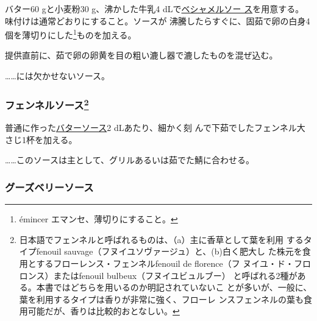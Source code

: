 \begin{recette}
バター60 gと小麦粉30 g、沸かした牛乳4
dLで\protect\hyperlink{sauce-bechamel}{ベシャメルソー
ス}を用意する。味付けは通常どおりにすること。ソースが
沸騰したらすぐに、固茹で卵の白身4個を薄切りにした\footnote{émincer
  エマンセ、薄切りにすること。}ものを加える。

提供直前に、茹で卵の卵黄を目の粗い漉し器で漉したものを混ぜ込む。

\ldots{}\ldots{}には欠かせないソース。

\maeaki

\hypertarget{fennel-sauce}{%
\subsubsection[フェンネルソース]{\texorpdfstring{フェンネルソース\footnote{日本語でフェンネルと呼ばれるものは、（a）主に香草として葉を利用
  するタイプfenouil sauvage（フヌイユソヴァージュ）と、(b)白く肥大し
  た株元を食用とするフローレンス・フェンネルfenouil de florence（フ
  ヌイユ・ド・フロロンス）またはfenouil bulbeux（フヌイユビュルブー）
  と呼ばれる2種がある。本書ではどちらを用いるのか明記されていないこ
  とが多いが、一般に、葉を利用するタイプは香りが非常に強く、フローレ
  ンスフェンネルの葉も食用可能だが、香りは比較的おとなしい。}}{フェンネルソース}}\label{fennel-sauce}}



普通に作った\protect\hyperlink{butter-sauce}{バターソース}2\undemi{}
dLあたり、細かく刻 んで下茹でしたフェンネル大さじ1杯を加える。

\ldots{}\ldots{}このソースは主として、グリルあるいは茹でた鯖に合わせる。

\maeaki

\hypertarget{gooseberry-sauce}{%
\subsubsection{グーズベリーソース}\label{gooseberry-sauce}}


\end{recette}
